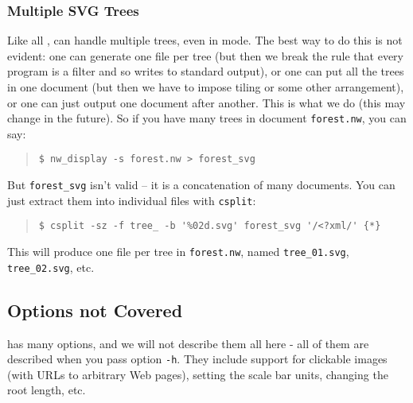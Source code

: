 \subsubsection{Multiple SVG Trees}

Like all \nutils, \display{} can handle multiple trees, even in \svg{} mode.
The best way to do this is not evident: one can generate one file per tree (but
then we break the rule that every program is a filter and so writes to standard
output), or one can put all the trees in one \svg{} document (but then we have
to impose tiling or some other arrangement), or one can just output one \svg{}
document after another. This is what we do (this may change in the future). So
if you have many trees in document \texttt{forest.nw}, you can say:
\begin{quote}
\verb+$ nw_display -s forest.nw > forest_svg+
\end{quote}
But \texttt{forest\_svg} isn't valid \svg{} -- it is a concatenation of many \svg{} documents. You can just extract them into individual files with \texttt{csplit}:
\begin{quote}
\verb+$ csplit -sz -f tree_ -b '%02d.svg' forest_svg '/<?xml/' {*}+
\end{quote}
This will produce one \svg{} file per tree in \texttt{forest.nw}, named \texttt{tree\_01.svg}, \texttt{tree\_02.svg}, etc.

\subsection{Options not Covered}

\display{} has many options, and we will not describe them all here - all of
them are described when you pass option \texttt{-h}. They include support for
clickable images (with URLs to arbitrary Web pages), setting the scale bar
units, changing the root length, etc. 
